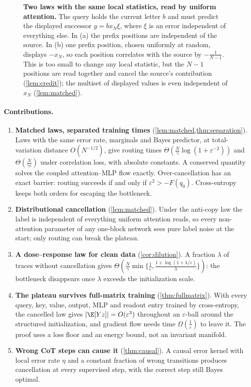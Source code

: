 \begin{figure}[t]
\centering
\resizebox{\linewidth}{!}{}
\caption{\textbf{Two laws with the same local statistics, read by uniform attention.} The query holds the current letter $b$ and
must predict the displayed successor $y=b x_N \xi$, where $\xi$ is an error independent of everything else. In (a) the prefix
positions are independent of the source. In (b) one prefix position, chosen uniformly at random, displays $-x_N$, so each position
correlates with the source by $-\tfrac{1}{N-1}$. This is too small to change any local statistic, but the $N-1$ positions are read
together and cancel the source's contribution (\cref{lem:credit}); the multiset of displayed values is even independent of $x_N$ (\cref{lem:matched}).}
\label{fig:cancel}
\end{figure}

\paragraph{Contributions.}
\begin{enumerate}[leftmargin=*,itemsep=2pt,topsep=2pt]
\item \textbf{Matched laws, separated training times} (\cref{lem:matched,thm:separation}). Laws with the same error rate, marginals and Bayes predictor,
at total-variation distance $O(N^{-1/2})$, give routing times $\Theta(\tfrac{N}{\gamma}\log(1+\varepsilon^{-2}))$ and $\Theta(\tfrac{N}{\gamma\varepsilon})$ under correlation loss,
with absolute constants. A conserved quantity solves the coupled attention--MLP flow exactly. Over-cancellation has an exact barrier: routing succeeds if and only if
$\varepsilon^2>-F(q_0)$. Cross-entropy keeps both orders for escaping the bottleneck.
\item \textbf{Distributional cancellation} (\cref{lem:matched}). Under the anti-copy law the label is independent of everything uniform attention reads,
so every non-attention parameter of any one-block network sees pure label noise at the start; only routing can break the plateau.
\item \textbf{A dose--response law for clean data} (\cref{cor:dilution}). A fraction $\lambda$ of traces without cancellation gives
$\Theta(\tfrac{N}{\gamma}\min\{\tfrac{1}{\varepsilon},\tfrac{1+\log(1+\lambda/\varepsilon)}{\lambda}\})$: the bottleneck disappears once $\lambda$ exceeds the initialization scale.
\item \textbf{The plateau survives full-matrix training} (\cref{thm:fullmatrix}). With every query, key, value, output, MLP and readout entry trained by
cross-entropy, the cancelled law gives $|\E[Yz]|=O(\varepsilon^3)$ throughout an $\varepsilon$-ball around the structured initialization, and gradient flow needs
time $\Omega(\tfrac{1}{\varepsilon})$ to leave it. The proof uses a loss floor and an energy bound, not an invariant manifold.
\item \textbf{Wrong CoT steps can cause it} (\cref{thm:causal}). A causal error kernel with local error rate $\eta$ and a constant fraction of wrong transitions
produces cancellation at every supervised step, with the correct step still Bayes optimal.
\end{enumerate}

